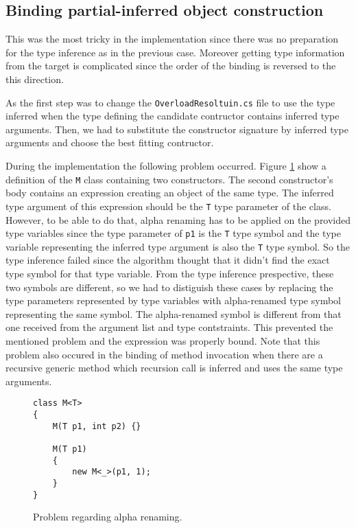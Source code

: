 \subsection{Binding partial-inferred object construction}

This was the most tricky in the implementation since there was no preparation for the type inference as in the previous case.
Moreover getting type information from the target is complicated since the order of the binding is reversed to the this direction.
\par
As the first step was to change the \texttt{OverloadResoltuin.cs} file to use the type inferred when the type defining the candidate contructor contains inferred type arguments.
Then, we had to substitute the constructor signature by inferred type arguments and choose the best fitting contructor.
\par
During the implementation the following problem occurred.
Figure \ref{img70:alpha} show a definition of the \texttt{M} class containing two constructors.
The second constructor's body contains an expression creating an object of the same type.
The inferred type argument of this expression should be the \texttt{T} type parameter of the class.
However, to be able to do that, alpha renaming has to be applied on the provided type variables since the type parameter of \texttt{p1} is the \texttt{T} type symbol and the type variable representing the inferred type argument is also the \texttt{T} type symbol.
So the type inference failed since the algorithm thought that it didn't find the exact type symbol for that type variable.
From the type inference prespective, these two symbols are different, so we had to distiguish these cases by replacing the type parameters represented by type variables with alpha-renamed type symbol representing the same symbol.
The alpha-renamed symbol is different from that one received from the argument list and type contstraints.
This prevented the mentioned problem and the expression was properly bound.
Note that this problem also occured in the binding of method invocation when there are a recursive generic method which recursion call is inferred and uses the same type arguments. 
\begin{figure}[h]
\begin{lstlisting}[style=csharp, showstringspaces=false]
class M<T> 
{
    M(T p1, int p2) {}
    
    M(T p1) 
    {
        new M<_>(p1, 1);
    }
}
\end{lstlisting}
\caption{Problem regarding alpha renaming.}
\label{img70:alpha}
\end{figure}
